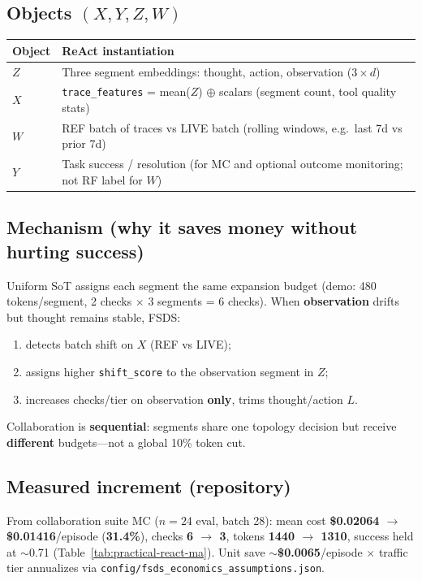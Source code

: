 \documentclass[11pt]{article}
\begin{document}
\subsection{Objects $(X,Y,Z,W)$}
\begin{center}
\begin{tabular}{@{}ll@{}}
\toprule
Object & ReAct instantiation \\
\midrule
$Z$ & Three segment embeddings: thought, action, observation ($3\times d$) \\
$X$ & \texttt{trace\_features} = mean($Z$) $\oplus$ scalars (segment count, tool quality stats) \\
$W$ & REF batch of traces vs LIVE batch (rolling windows, e.g.\ last 7d vs prior 7d) \\
$Y$ & Task success / resolution (for MC and optional outcome monitoring; not RF label for $W$) \\
\bottomrule
\end{tabular}
\end{center}

\subsection{Mechanism (why it saves money without hurting success)}
Uniform SoT assigns each segment the same expansion budget (demo: 480 tokens/segment, 2 checks $\times$ 3 segments = 6 checks).
When \textbf{observation} drifts but thought remains stable, FSDS:
\begin{enumerate}[nosep]
  \item detects batch shift on $X$ (REF vs LIVE);
  \item assigns higher \texttt{shift\_score} to the observation segment in $Z$;
  \item increases checks/tier on observation \textbf{only}, trims thought/action $L$.
\end{enumerate}
Collaboration is \textbf{sequential}: segments share one topology decision but receive \textbf{different} budgets---not a global 10\% token cut.

\subsection{Measured increment (repository)}
From collaboration suite MC ($n{=}24$ eval, batch 28): mean cost \textbf{\$0.02064 $\rightarrow$ \$0.01416}/episode (\textbf{31.4\%}), checks \textbf{6 $\rightarrow$ 3}, tokens \textbf{1440 $\rightarrow$ 1310}, success held at $\sim$0.71 (Table~\ref{tab:practical-react-ma}).
Unit save $\sim$\textbf{\$0.0065}/episode $\times$ traffic tier annualizes via \texttt{config/fsds\_economics\_assumptions.json}.
\end{document}
